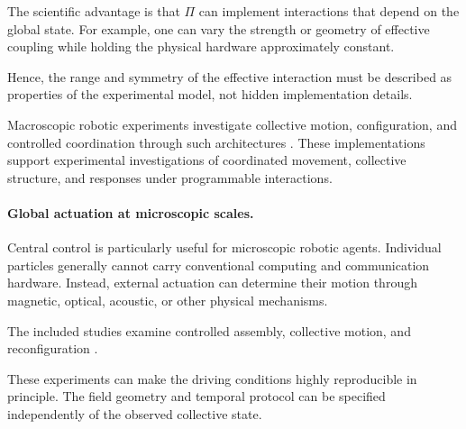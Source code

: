 The scientific advantage is that
$\Pi$ can implement interactions
that depend on the global state.
For example, one can vary the
strength or geometry of effective
coupling while holding the
physical hardware approximately
constant.

Hence, the range and symmetry
of the effective interaction
must be described as properties
of the experimental model,
not hidden implementation
details.

Macroscopic robotic experiments
investigate collective motion,
configuration, and controlled
coordination through such
architectures
\cite{Yamada2011circularmotiongene,Sankar2026trendformationwith,Pan2026exploringthephysic,Zhou2024anticipationpromote,Bahaidarah2024swarmflockingusing,Santos2014cohesionandsegrega,PliegoJimnez2023flockingandformati,Hou2009ontheimplementatio,Min2011designandanalysis,Beattie2025realizingemergentc,Li2026onfeedbackspeedco,Zheng2024emergenceofcollect,Zhou2025gazingpreferencein,Zheng2025shapingcollectiveb,Maffettone2024mixedrealityenviro,Abpeikar2023iterativetransferl}.
These implementations support experimental
investigations of coordinated movement,
collective structure, and responses
under programmable interactions.

\paragraph*{Global actuation at microscopic scales.}

Central control is particularly useful
for microscopic robotic agents.
Individual particles generally cannot
carry conventional computing and
communication hardware. Instead,
external actuation can determine
their motion through magnetic,
optical, acoustic, or other
physical mechanisms.

The included studies examine controlled
assembly, collective motion, and
reconfiguration
\cite{Pauer2021programmabledesign,McGovern2024multifunctionalchir,Sun2024multiplemagnetoopt,Je2024spatiallyselective,Li2023swarmingresponsive,Liu2022bionicmorphological,Chen2020temporallightmodul,Chen2022programmablespatio,Tran2025roboticmicrocapsule,Baker2019shapeprogrammed3d,Gao2025softmagneticmicror,Raghavendra2026programmablepersist,Ahmed2021bioinspiredacousto,Chen2024magneticactuatedhy}.

These experiments can make the
driving conditions highly
reproducible in principle.
The field geometry and temporal
protocol can be specified
independently of the
observed collective state.

